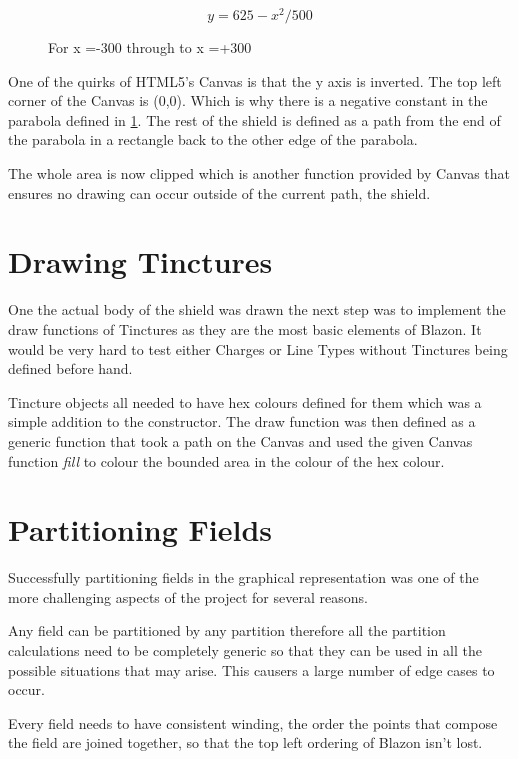 \begin{figure}[H]
$$ y = 625- x^2/500  $$
\caption{For x =-300 through to x =+300}
\label{math:curve}
\end{figure}


One of the quirks of HTML5's Canvas is that the y axis is inverted.  The top left corner of the Canvas is (0,0).  Which is why there is a negative constant in the parabola defined in \ref{math:curve}.  The rest of the shield is defined as a path from the end of the parabola in a rectangle back to the other edge of the parabola.

The whole area is now clipped which is another function provided by Canvas that ensures no drawing can occur outside of the current path, the shield. 


\section{Drawing Tinctures}
{
	
One the actual body of the shield was drawn the next step was to implement the draw functions of Tinctures as they are the most basic elements of Blazon.  It would be very hard to test either Charges or Line Types without Tinctures being defined before hand.

Tincture objects all needed to have hex colours defined for them which was a simple addition to the constructor.  The draw function was then defined as a generic function that took a path on the Canvas and used the given Canvas function \emph{fill} to colour the bounded area in the colour of the hex colour.  

}

\section{Partitioning Fields}

Successfully partitioning fields in the graphical representation was one of the more challenging aspects of the project for several reasons.


Any field can be partitioned by any partition therefore all the partition calculations need to be completely generic so that they can be used in all the possible situations that may arise.  This causers a large number of edge cases to occur. 

Every field needs to have consistent winding, the order the points that compose the field are joined together, so that the top left ordering of Blazon isn't lost.


